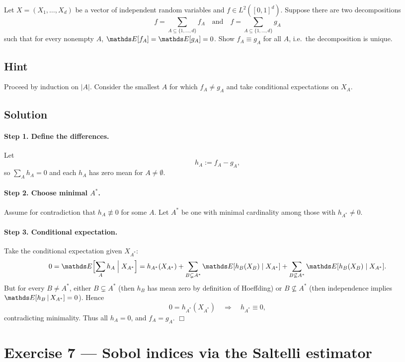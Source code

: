 \documentclass[a4paper]{article}
\begin{document}
Let $X=(X_1,\dots,X_d)$ be a vector of independent random variables and
$f\in L^2([0,1]^d)$.  Suppose there are two decompositions
\[
f=\sum_{A\subseteq\{1,\dots,d\}} f_A
\quad\text{and}\quad
f=\sum_{A\subseteq\{1,\dots,d\}} g_A
\]
such that for every nonempty $A$, $\E[f_A]=\E[g_A]=0$.  Show $f_A\equiv g_A$
for all $A$, i.e.\ the decomposition is unique.

\subsection*{Hint}
Proceed by induction on $|A|$.  Consider the smallest $A$ for which
$f_A\neq g_A$ and take conditional expectations on $X_A$.

\subsection*{Solution}

\paragraph{Step 1. Define the differences.}
Let
\[
h_A := f_A - g_A,
\]
so $\sum_A h_A = 0$ and each $h_A$ has zero mean for $A\neq\emptyset$.

\paragraph{Step 2. Choose minimal $A^*$.}
Assume for contradiction that $h_A\not\equiv0$ for some $A$.  Let $A^*$ be
one with minimal cardinality among those with $h_{A^*}\neq0$.

\paragraph{Step 3. Conditional expectation.}
Take the conditional expectation given $X_{A^*}$:
\[
0
= \E\Bigl[\sum_A h_A \Bigm| X_{A^*}\Bigr]
= h_{A^*}(X_{A^*})
  + \sum_{B\subsetneq A^*} \E[h_B(X_B)\mid X_{A^*}]
  + \sum_{B\not\subseteq A^*} \E[h_B(X_B)\mid X_{A^*}].
\]
But for every $B\neq A^*$, either $B\subsetneq A^*$ (then $h_B$ has mean zero
by definition of Hoeffding) or $B\not\subseteq A^*$ (then independence
implies $\E[h_B\,|\,X_{A^*}]=0$).  Hence
\[
0 = h_{A^*}(X_{A^*})
\quad\Longrightarrow\quad
h_{A^*}\equiv0,
\]
contradicting minimality.  Thus all $h_A=0$, and $f_A=g_A$.
\hfill\(\Box\)

\section*{Exercise 7 — Sobol indices via the Saltelli estimator}
\label{ex:Sobol_numeric_improved}
\end{document}
